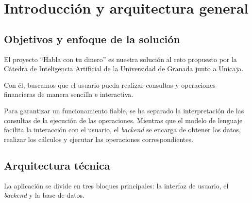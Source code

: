 \section{Introducción y arquitectura general}

\subsection{Objetivos y enfoque de la solución}

El proyecto ``Habla con tu dinero'' es nuestra solución al reto propuesto por 
la Cátedra de Inteligencia Artificial de la Universidad de Granada junto a Unicaja. 

Con él, buscamos que el usuario pueda realizar consultas y operaciones financieras de 
manera sencilla e interactiva.

Para garantizar un funcionamiento fiable, se ha separado la interpretación de
las consultas de la ejecución de las operaciones. Mientras que el modelo de lenguaje 
facilita la interacción con el usuario, el \emph{backend}
se encarga de obtener los datos, realizar los cálculos y ejecutar las
operaciones correspondientes.

\subsection{Arquitectura técnica}

La aplicación se divide en tres bloques principales: la interfaz de usuario,
el \emph{backend} y la base de datos.




